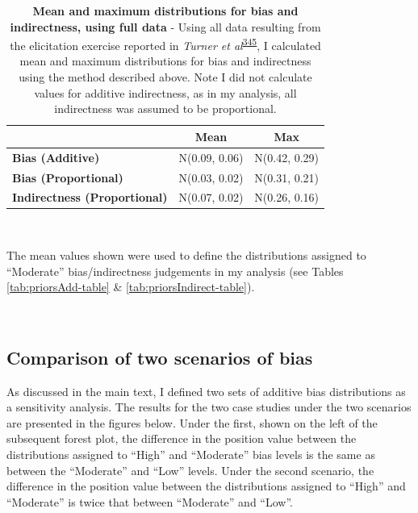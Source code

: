 \documentclass[a4paper, twoside]{templates/ociamthesis}
\begin{document}
\begin{table}[H]

\caption[Mean and maximum distributions for bias and indirectness, using full data]{\label{tab:turnerEstimates-table}\textbf{Mean and maximum distributions for bias and indirectness, using full data} - Using all data resulting from the elicitation exercise reported in \emph{Turner et al}\textsuperscript{\protect\hyperlink{ref-turner2009}{345}}, I calculated mean and maximum distributions for bias and indirectness using the method described above. Note I did not calculate values for additive indirectness, as in my analysis, all indirectness was assumed to be proportional.}
\centering
\begin{tabular}[t]{>{}lcc}
\toprule
\textbf{ } & \textbf{Mean} & \textbf{Max}\\
\midrule
\textbf{Bias (Additive)} & N(0.09, 0.06) & N(0.42, 0.29)\\
\textbf{Bias (Proportional)} & N(0.03, 0.02) & N(0.31, 0.21)\\
\textbf{Indirectness (Proportional)} & N(0.07, 0.02) & N(0.26, 0.16)\\
\bottomrule
\end{tabular}
\end{table}

~

The mean values shown were used to define the distributions assigned to ``Moderate'' bias/indirectness judgements in my analysis (see Tables \ref{tab:priorsAdd-table} \& \ref{tab:priorsIndirect-table}).

~

\hypertarget{comparison-of-two-scenarios-of-bias}{%
\subsection{Comparison of two scenarios of bias}\label{comparison-of-two-scenarios-of-bias}}

As discussed in the main text, I defined two sets of additive bias distributions as a sensitivity analysis. The results for the two case studies under the two scenarios are presented in the figures below. Under the first, shown on the left of the subsequent forest plot, the difference in the position value between the distributions assigned to ``High'' and ``Moderate'' bias levels is the same as between the ``Moderate'' and ``Low'' levels. Under the second scenario, the difference in the position value between the distributions assigned to ``High'' and ``Moderate'' is twice that between ``Moderate'' and ``Low''.
\end{document}

